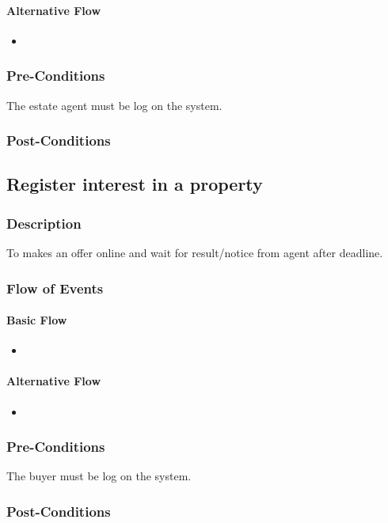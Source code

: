 \documentclass[a4paper,12pt]{article}
\begin{document}
\paragraph{Alternative Flow}
\begin{itemize}
\item
\end{itemize}
\subsubsection{Pre-Conditions}
The estate agent must be log on the system.
\subsubsection{Post-Conditions}

\subsection{Register interest in a property}
\subsubsection{Description}
To makes an offer online and wait for result/notice from agent after deadline.
\subsubsection{Flow of Events}
\paragraph{Basic Flow}
\begin{itemize}
\item
\end{itemize}
\paragraph{Alternative Flow}
\begin{itemize}
\item
\end{itemize}
\subsubsection{Pre-Conditions}
The buyer must be log on the system.
\subsubsection{Post-Conditions}
\end{document}
